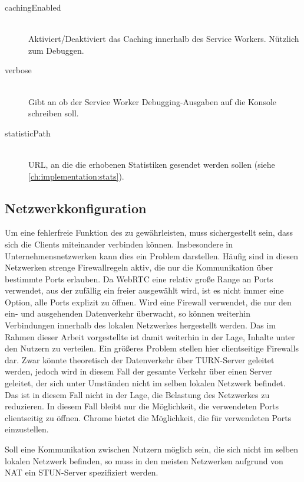 \begin{description}
\item[cachingEnabled]\hfill \\
Aktiviert/Deaktiviert das Caching innerhalb des Service Workers. Nützlich zum Debuggen.
\item[verbose]\hfill \\
Gibt an ob der Service Worker Debugging-Ausgaben auf die Konsole schreiben soll.
\item[statisticPath]\hfill \\
URL, an die die erhobenen Statistiken gesendet werden sollen (siehe \ref{ch:implementation:stats}).

\end{description}

\subsection{Netzwerkkonfiguration}

Um eine fehlerfreie Funktion des \cdns zu gewährleisten, muss sichergestellt sein, dass sich die Clients miteinander verbinden können. Insbesondere in Unternehmensnetzwerken kann dies ein Problem darstellen. Häufig sind in diesen Netzwerken strenge Firewallregeln aktiv, die nur die Kommunikation über bestimmte Ports erlauben. Da WebRTC eine relativ große Range an Ports verwendet, aus der zufällig ein freier ausgewählt wird, ist es nicht immer eine Option, alle Ports explizit zu öffnen. Wird eine Firewall verwendet, die nur den ein- und ausgehenden Datenverkehr überwacht, so können weiterhin Verbindungen innerhalb des lokalen Netzwerkes hergestellt werden. Das im Rahmen dieser Arbeit vorgestellte \cdn ist damit weiterhin in der Lage, Inhalte unter den Nutzern zu verteilen. Ein größeres Problem stellen hier clientseitige Firewalls dar. Zwar könnte theoretisch der Datenverkehr über TURN-Server geleitet werden, jedoch wird in diesem Fall der gesamte Verkehr über einen Server geleitet, der sich unter Umständen nicht im selben lokalen Netzwerk befindet. Das \cdn ist in diesem Fall nicht in der Lage, die Belastung des Netzwerkes zu reduzieren. In diesem Fall bleibt nur die Möglichkeit, die verwendeten Ports clientseitig zu öffnen. Chrome bietet die Möglichkeit, die für \webrtc verwendeten Ports einzustellen.\cite{chrome-port-range} 

Soll eine Kommunikation zwischen Nutzern möglich sein, die sich nicht im selben lokalen Netzwerk befinden, so muss in den meisten Netzwerken aufgrund von NAT ein STUN-Server spezifiziert werden.  
